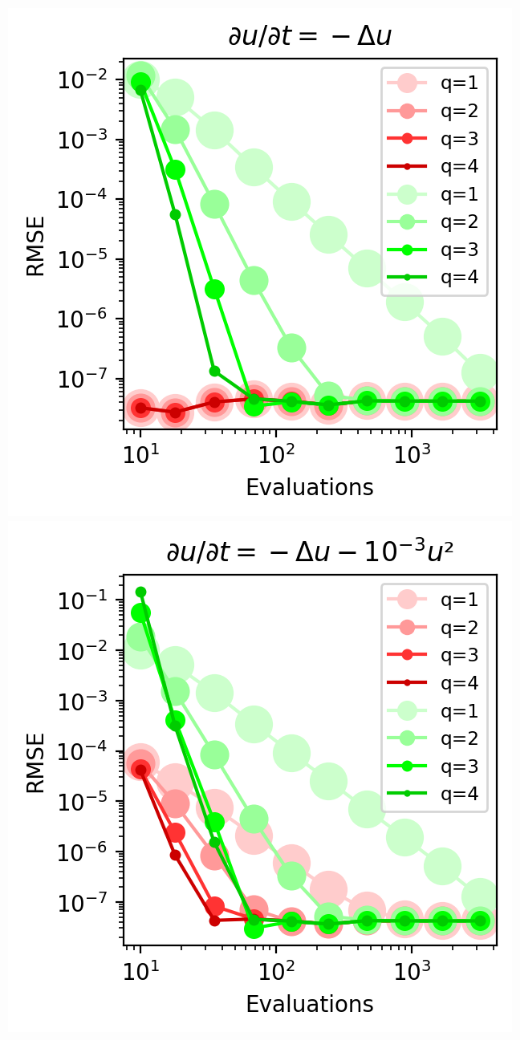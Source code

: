 \begin{center}
    \includegraphics[width=\columnwidth]{../images/solver_heat.png}
    \includegraphics[width=\columnwidth]{../images/solver_heat and medium square.png}

\end{center}
